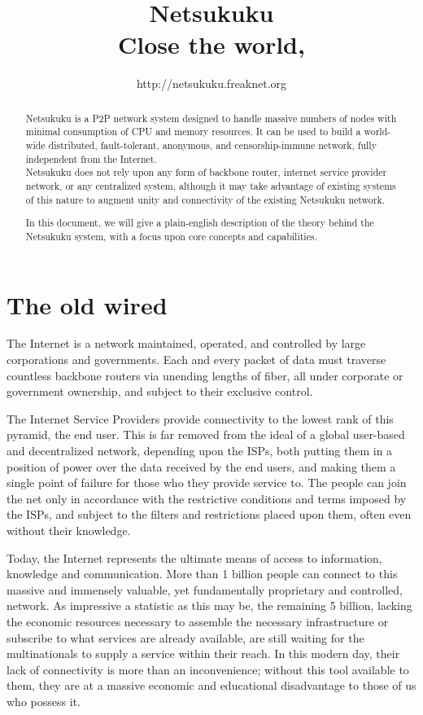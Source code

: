 \documentclass[a4paper]{article}
\title{Netsukuku\\
{\small Close the world, \reflectbox{Open the next}}}
\author{http://netsukuku.freaknet.org}
\begin{document}
\maketitle

\begin{abstract}
Netsukuku is a P2P network system designed to handle massive numbers of nodes 
with minimal consumption of CPU and memory resources.  It can be used to build a
world-wide distributed, fault-tolerant, anonymous, and censorship-immune network,
fully independent from the Internet.\\
Netsukuku does not rely upon any form of backbone router, internet service 
provider network, or any centralized system, although it may take advantage of
existing systems of this nature to augment unity and connectivity of the 
existing Netsukuku network. 

In this document, we will give a plain-english description of the theory 
behind the Netsukuku system, with a focus upon core concepts and capabilities.
\end{abstract}


\section{The old wired}

The Internet is a network maintained, operated, and controlled 
by large corporations and governments.  Each and every packet of data must 
traverse countless backbone routers via unending lengths of fiber, all 
under corporate or government ownership, and subject to their exclusive control.

The Internet Service Providers provide connectivity to the lowest rank of
this pyramid, the end user.
This is far removed from the ideal of a global user-based and decentralized 
network, depending upon the ISPs, both putting them in a position of power 
over the data received by the end users, and making them a single point of
failure for those who they provide service to.
The people can join the net only in accordance with the restrictive conditions
and terms imposed by the ISPs, and subject to the filters and restrictions
placed upon them, often even without their knowledge.

Today, the Internet represents the ultimate means of access to information, 
knowledge and communication.  More than 1 billion people\cite{mwmgstats}
can connect to this massive and immensely valuable, yet fundamentally 
proprietary and controlled, network. As impressive a statistic as this may
be, the remaining 5 billion, lacking the economic resources necessary to 
assemble the necessary infrastructure or subscribe to what services are 
already available, are still waiting for the multinationals to supply a 
service within their reach.  In this modern day, their lack of connectivity 
is more than an inconvenience; without this tool available to them, they 
are at a massive economic and educational disadvantage to those of us 
who possess it. \\
\end{document}
